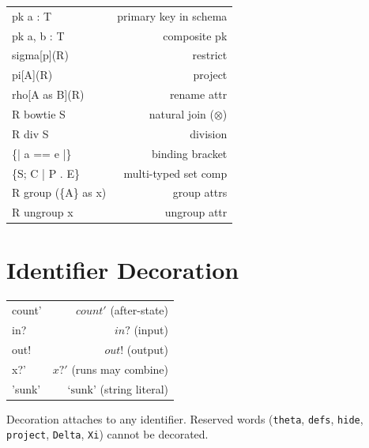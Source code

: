 \documentclass[10pt,landscape,a4paper]{article}
\begin{document}
\begin{multicols}{3}
\begin{tabularx}{\columnwidth}{LR}
pk a : T             & primary key in schema \\
pk a, b : T          & composite pk \\
sigma[p](R)          & restrict \\
pi[A](R)             & project \\
rho[A as B](R)       & rename attr \\
R bowtie S           & natural join ($\otimes$) \\
R div S              & division \\
\{| a == e |\}       & binding bracket \\
\{S; C | P . E\}    & multi-typed set comp \\
R group (\{A\} as x) & group attrs \\
R ungroup x          & ungroup attr \\
\end{tabularx}

\section{Identifier Decoration}

\begin{tabularx}{\columnwidth}{LR}
count'               & $count'$ (after-state) \\
in?                  & $in?$ (input) \\
out!                 & $out!$ (output) \\
x?'                  & $x?'$ (runs may combine) \\
'sunk'               & $\mbox{`sunk'}$ (string literal) \\
\end{tabularx}

{\footnotesize Decoration attaches to any identifier. Reserved words (\texttt{theta}, \texttt{defs}, \texttt{hide}, \texttt{project}, \texttt{Delta}, \texttt{Xi}) cannot be decorated.}

\end{multicols}
\end{document}
